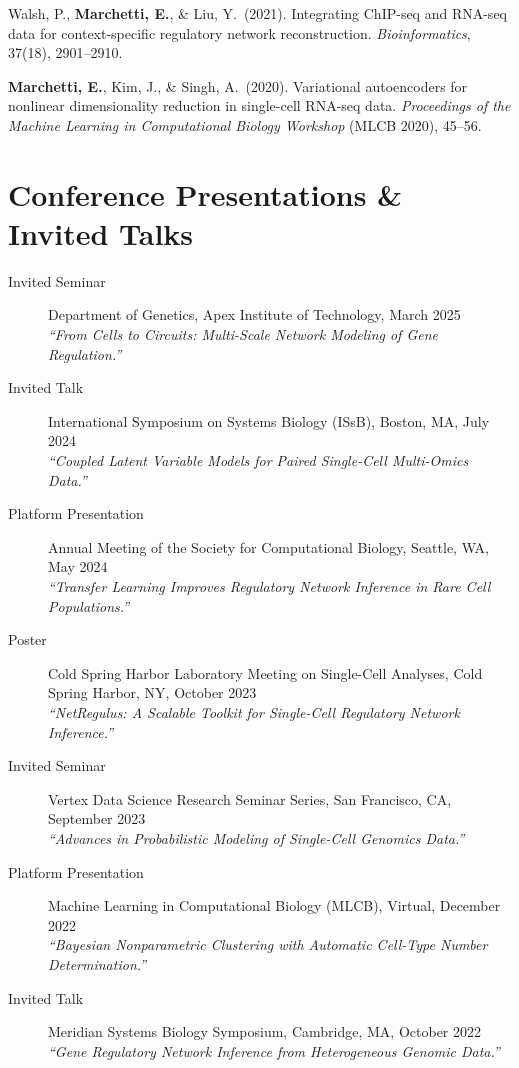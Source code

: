 \documentclass[11pt,a4paper]{article}
\begin{document}
{\begin{enumerate}[leftmargin=2.5em,label={[\arabic*]},itemsep=5pt,topsep=6pt]
  \item Walsh, P., \textbf{Marchetti, E.}, \& Liu, Y.\ (2021). Integrating ChIP-seq and RNA-seq data for context-specific regulatory network reconstruction. \textit{Bioinformatics}, 37(18), 2901--2910.

  \item \textbf{Marchetti, E.}, Kim, J., \& Singh, A.\ (2020). Variational autoencoders for nonlinear dimensionality reduction in single-cell RNA-seq data. \textit{Proceedings of the Machine Learning in Computational Biology Workshop} (MLCB 2020), 45--56.
\end{enumerate}
}

\section{Conference Presentations \& Invited Talks}

\begin{description}
  \item[Invited Seminar] Department of Genetics, Apex Institute of Technology, March 2025\\
  \textit{``From Cells to Circuits: Multi-Scale Network Modeling of Gene Regulation.''}

  \item[Invited Talk] International Symposium on Systems Biology (IS\lowercase{s}B), Boston, MA, July 2024\\
  \textit{``Coupled Latent Variable Models for Paired Single-Cell Multi-Omics Data.''}

  \item[Platform Presentation] Annual Meeting of the Society for Computational Biology, Seattle, WA, May 2024\\
  \textit{``Transfer Learning Improves Regulatory Network Inference in Rare Cell Populations.''}

  \item[Poster] Cold Spring Harbor Laboratory Meeting on Single-Cell Analyses, Cold Spring Harbor, NY, October 2023\\
  \textit{``NetRegulus: A Scalable Toolkit for Single-Cell Regulatory Network Inference.''}

  \item[Invited Seminar] Vertex Data Science Research Seminar Series, San Francisco, CA, September 2023\\
  \textit{``Advances in Probabilistic Modeling of Single-Cell Genomics Data.''}

  \item[Platform Presentation] Machine Learning in Computational Biology (MLCB), Virtual, December 2022\\
  \textit{``Bayesian Nonparametric Clustering with Automatic Cell-Type Number Determination.''}

  \item[Invited Talk] Meridian Systems Biology Symposium, Cambridge, MA, October 2022\\
  \textit{``Gene Regulatory Network Inference from Heterogeneous Genomic Data.''}
\end{description}
\end{document}
